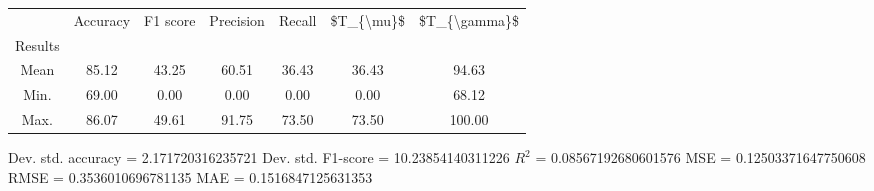 \begin{tabular}{|c|c|c|c|c|c|c|}
\toprule
{} &  Accuracy &  F1 score &  Precision &  Recall &  \$T\_\{\textbackslash mu\}\$ &  \$T\_\{\textbackslash gamma\}\$ \\
Results &           &           &            &         &            &               \\
\hline
Mean    &     85.12 &     43.25 &      60.51 &   36.43 &      36.43 &         94.63 \\
Min.    &     69.00 &      0.00 &       0.00 &    0.00 &       0.00 &         68.12 \\
Max.    &     86.07 &     49.61 &      91.75 &   73.50 &      73.50 &        100.00 \\
\bottomrule
\end{tabular}

 Dev. std. accuracy = 2.171720316235721
 Dev. std. F1-score = 10.23854140311226
 $R^2$ = 0.08567192680601576
 MSE = 0.12503371647750608
 RMSE = 0.3536010696781135
 MAE = 0.1516847125631353